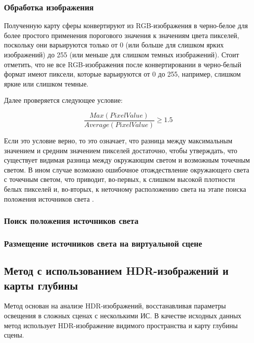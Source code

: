 \subsubsection*{Обработка изображения}

Полученную карту сферы конвертируют из RGB-изображения в черно-белое для более простого применения порогового значения к
значениям цвета пикселей, поскольку они варьируются только от 0 (или больше для слишком ярких изображений) до 255 (или меньше для слишком темных изображений). Стоит отметить, что не все RGB-изображения после конвертировании в черно-белый формат имеют пиксели, которые варьируются от 0 до 255, например, слишком яркие или слишком темные.

Далее проверяется следующее условие:

\begin{equation}
	\frac{Max(PixelValue)}{Average(PixelValue)} \geq 1.5
\end{equation}

Если это условие верно, то это означает, что разница между максимальным значением и средним значением пикселей достаточно, чтобы утверждать, что существует видимая разница между окружающим светом и возможным точечным светом. В ином случае возможно ошибочное отождествление окружающего света с точечным светом, что приводит, во-первых, к слишком высокой плотности белых пикселей и, во-вторых, к неточному расположению света на этапе поиска положения источников света \cite{rtsm}.

\subsubsection*{Поиск положения источников света}



\subsubsection*{Размещение источников света на виртуальной сцене}


\subsection{Метод с использованием HDR-изображений и карты глубины}

Метод основан на анализе HDR-изображений, восстанавливая параметры освещения в сложных сценах с несколькими ИС. В качестве исходных данных метод использует HDR-изображение видимого пространства и карту глубины сцены.

